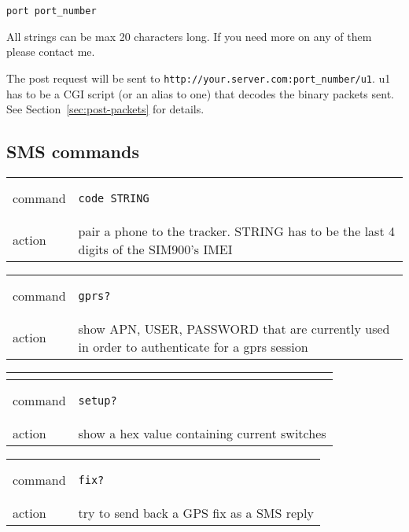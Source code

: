\documentclass[a4paper,twoside]{refart}
\begin{document}
\begin{lstlisting}
port port_number
\end{lstlisting}

 All strings can be max 20 characters long. If you need more on any of them please contact me.

The post request will be sent to \verb"http://your.server.com:port_number/u1". u1 has to be a CGI script (or an alias to one) that decodes the binary packets sent. See Section~\ref{sec:post-packets} for details.

\subsection{SMS commands}

\begin{tabular}{ |l|p{8cm}| }
    \hline
        command & 
\begin{lstlisting}
code STRING
\end{lstlisting} \\
        action & pair a phone to the tracker.
STRING has to be the last 4 digits of the SIM900's IMEI \\ \hline
\end{tabular}


\begin{tabular}{ |l|p{8cm}| }
    \hline
        command & 
\begin{lstlisting}
gprs?
\end{lstlisting} \\
        action & show APN, USER, PASSWORD that are currently used in order to authenticate for a gprs session \\ \hline
\end{tabular}


\begin{tabular}{ |l|p{8cm}| }
    \hline
    \multicolumn{2}{|l|}{} \\
    \hline
        command & 
\begin{lstlisting}
setup?
\end{lstlisting} \\
        action & show a hex value containing current switches \\ \hline
\end{tabular}


\begin{tabular}{ |l|p{8cm}| }
    \hline
        command & 
\begin{lstlisting}
fix?
\end{lstlisting} \\
        action & 
try to send back a GPS fix as a SMS reply \\ \hline
\end{tabular}
\end{document}
